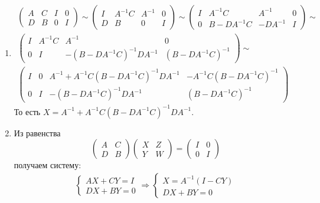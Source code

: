 \begin{problem}
\begin{sol}
\begin{enumerate}
\item \begin{multline*}
\left(
\begin{array}{cc|cc}
A & C & I & 0 \\
D & B & 0 & I
\end{array}
\right)
\sim
\left(
\begin{array}{cc|cc}
I & A^{-1}C & A^{-1} & 0 \\
D & B & 0 & I
\end{array}
\right)
\sim
\left(
\begin{array}{cc|cc}
I & A^{-1}C & A^{-1} & 0 \\
0 & B - DA^{-1}C & -DA^{-1} & I
\end{array}
\right)
\sim \\
\left(
\begin{array}{cc|cc}
I & A^{-1}C & A^{-1} & 0 \\
0 & I & -(B - DA^{-1}C)^{-1}DA^{-1} & (B - DA^{-1}C)^{-1}
\end{array}
\right)
\sim \\
\left(
\begin{array}{cc|cc}
I & 0 & A^{-1} + A^{-1}C(B - DA^{-1}C)^{-1}DA^{-1}   & -A^{-1}C(B - DA^{-1}C)^{-1} \\
0 & I & -(B - DA^{-1}C)^{-1}DA^{-1} & (B - DA^{-1}C)^{-1}
\end{array}
\right)
\end{multline*}
То есть $X = A^{-1} + A^{-1}C(B - DA^{-1}C)^{-1}DA^{-1}$.
\item Из равенства
\[
\begin{pmatrix}
A & C \\
D & B
\end{pmatrix}
\begin{pmatrix}
X & Z \\
Y & W
\end{pmatrix}
=
\begin{pmatrix}
I & 0 \\
0 & I
\end{pmatrix}
\]
получаем систему:
\begin{align*}
\begin{cases}
AX + CY = I \\
DX + BY = 0
\end{cases}
\Rightarrow
\begin{cases}
X  = A^{-1}(I-CY) \\
DX + BY = 0
\end{cases}

\end{align*}
\end{enumerate}
\end{sol}
\end{problem}
